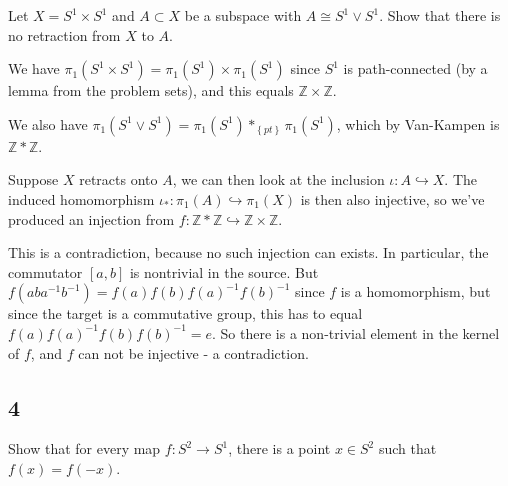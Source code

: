 Let \(X = S^1 \times S^1\) and \(A\subset X\) be a subspace with
\(A \cong S^1 \vee S^1\). Show that there is no retraction from \(X\) to
\(A\).

\begin{solution}

We have \(\pi_1(S^1 \times S^1) = \pi_1(S^1) \times\pi_1(S^1)\) since
\(S^1\) is path-connected (by a lemma from the problem sets), and this
equals \({\mathbb{Z}}\times{\mathbb{Z}}\).

We also have
\(\pi_1(S^1 \vee S^1) = \pi_1(S^1) \ast_{\left\{{pt}\right\}} \pi_1(S^1)\),
which by Van-Kampen is \({\mathbb{Z}}\ast {\mathbb{Z}}\).

Suppose \(X\) retracts onto \(A\), we can then look at the inclusion
\(\iota: A \hookrightarrow X\). The induced homomorphism
\(\iota_*: \pi_1(A) \hookrightarrow\pi_1(X)\) is then also injective, so
we've produced an injection from
\(f: {\mathbb{Z}}\ast {\mathbb{Z}}\hookrightarrow{\mathbb{Z}}\times{\mathbb{Z}}\).

This is a contradiction, because no such injection can exists. In
particular, the commutator \([a,b]\) is nontrivial in the source. But
\(f(aba^{-1}b^{-1}) = f(a)f(b)f(a)^{-1}f(b)^{-1}\) since \(f\) is a
homomorphism, but since the target is a commutative group, this has to
equal \(f(a)f(a)^{-1} f(b)f(b)^{-1} = e\). So there is a non-trivial
element in the kernel of \(f\), and \(f\) can not be injective - a
contradiction.

\end{solution}

\hypertarget{section-17}{%
\subsection{4}\label{section-17}}

Show that for every map \(f: S^2 \to S^1\), there is a point
\(x\in S^2\) such that \(f(x) = f(-x)\).

